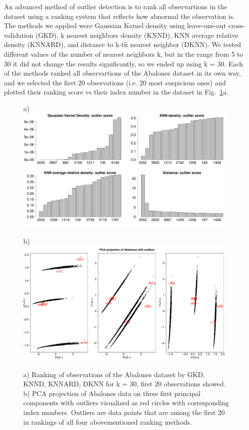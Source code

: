 \documentclass[10pt, paper=a4]{article}
\begin{document}
An advanced method of outlier detection is to rank all observartions in the
dataset using a ranking system that reflects how abnormal the observation is.
The methods we applied were Gaussian Kernel density using leave-one-out
cross-validation (GKD), k nearest neighbors density (KNND), KNN average relative
density (KNNARD), and distance to k-th nearest neighbor (DKNN).  We tested
different values of the number of nearest neighbors k, but in the range from 5
to 30 it did not change the results significantly, so we ended up using k = 30.
Each of the methods ranked all observartions of the Abalones dataset in its own
way, and we selected the first 20 observations (i.e. 20 most suspicious ones)
and plotted their ranking score vs their index number in the dataset in
Fig.~\ref{fig:data_ranking}a.

\begin{figure}[h!]
  \begin{minipage}{0.99\textwidth}
    a)\\
    \includegraphics[width = 0.99\textwidth]{data_ranking.pdf}
  \end{minipage} \vfill
  \begin{minipage}{0.99\textwidth}
    b)\\
    \includegraphics[width = 0.99\textwidth]{data_outliers.pdf}
  \end{minipage} \vfill
  \caption{a) Ranking of observations of the Abalones dataset by GKD, KNND,
    KNNARD, DKNN for k = 30, first 20 observations showed.  b) PCA projection of
    Abalones data on three first principal components with outliers visualized
    as red circles with corresponding index numbers.  Outliers are data points
    that are among the first 20 in rankings of all four abovementioned ranking
    methods.}
  \label{fig:data_ranking}
\end{figure}
\end{document}
